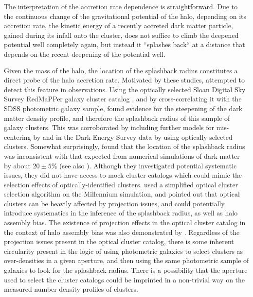 \documentclass[iop, apjl, twocolappendix, numberedappendix]{emulateapj}
\begin{document}
The interpretation of the accretion rate dependence is
straightforward. Due to the continuous change of the gravitational
potential of the halo, depending on its accretion rate, the kinetic
energy of a recently accreted dark matter particle, gained during
its infall onto the cluster, does not suffice to climb the deepened
potential well completely again, but instead it ``splashes back`` at
a distance that depends on the recent deepening of the potential
well.

Given the mass of the halo, the location of the splashback radius
constitutes a direct probe of the halo accretion rate. Motivated by
these studies, \citet{more2016detection} attempted to detect this
feature in observations. Using the optically selected Sloan Digital
Sky Survey RedMaPPer galaxy cluster catalog
\citep{rykoff2014redmapper}, and by cross-correlating it with the
SDSS photometric galaxy sample, \citet{more2016detection} found evidence
for the steepening of the dark matter density profile, and therefore
the splashback radius of this sample of galaxy clusters. This was 
corroborated by including further models for mis-centering by
\citet{baxter2017halo} and in the Dark Energy Survey data by
\citet{chang2017splashback} using optically selected clusters. Somewhat surprisingly,
\citet{more2016detection} found that the location of the splashback radius was
inconsistent with that expected from numerical simulations of dark matter by
about $20\pm5$\% (see also \citet{baxter2017halo, chang2017splashback}).
Although they
investigated potential systematic issues, they did not have access
to mock cluster catalogs which could mimic the selection effects of
optically-identified clusters. \citet{busch2017assembly} used a
simplified optical cluster selection algorithm on the Millennium
simulation, and pointed out that optical clusters can be heavily
affected by projection issues, and could potentially introduce
systematics in the inference of the splashback radius, as well as
halo assembly bias. The existence of projection effects in the
optical cluster catalog in the context of halo assembly bias was 
also demonstrated by \citet{zu2016level}. Regardless of the
projection issues present in the optical cluster catalog, there is some
inherent circularity present in the logic of using photometric galaxies to
select clusters as over-densities in a given aperture, and then using the same
photometric sample of galaxies to look for the splashback radius. There is a
possibility that the aperture used to select the cluster catalogs could be
imprinted in a non-trivial way on the measured number density profiles of
clusters.
\end{document}
